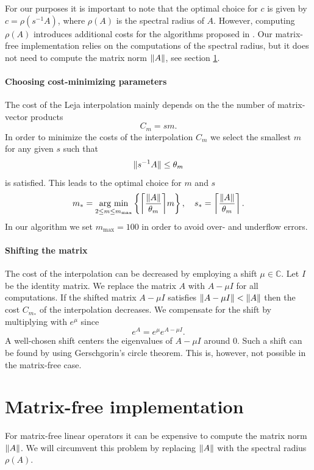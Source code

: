 \documentclass{scrartcl}
\begin{document}
For our purposes it is important to note that the optimal choice for $c$ is given by $c=\rho(s^{-1}A)$, where $\rho(A)$ is the spectral radius of $A$. However, computing $\rho(A)$ introduces additional costs for the algorithms proposed in \cite{lejarev}. Our matrix-free implementation relies on the computations of the spectral radius, but it does not need to compute the matrix norm $\lVert A\rVert$, see section \ref{matrixfreeimplementation}.

\paragraph{Choosing cost-minimizing parameters}
The cost of the Leja interpolation mainly depends on the the number of matrix-vector products
\[
C_{m} = sm. 
\]
In order to minimize the costs of the interpolation $C_m$ we select the smallest $m$ for any given $s$ such that
\[
\lVert s^{-1}A\rVert \le \theta_m
\]
is satisfied. This leads to the optimal choice for $m$ and $s$ 
\[
m_* = \underset{2\le m\le m_{\operatorname{max}}}{\operatorname{arg\ min}}  \left\{{\left\lceil{\frac{\norm{A}}{\theta_m}}\right\rceil}m\right\}, \quad
s_* =  \left\lceil{\frac{\norm{A}}{\theta_m}}\right\rceil.
\]
In our algorithm we set $m_{\operatorname{max}} = 100$ in order to avoid over- and underflow errors.

\paragraph{Shifting the matrix}
The cost of the interpolation can be decreased by employing a shift $\mu\in\mathbb{C}$. Let $I$ be the identity matrix. We replace the matrix $A$ with $A-\mu I$ for all computations. If the shifted matrix $A-\mu I$ satisfies $\lVert A -\mu I\rVert < \lVert A\rVert$ then the cost $C_{m_*}$ of the interpolation decreases.
We compensate for the shift by multiplying with $e^\mu$ since
\[
	e^{A} = e^{\mu}e^{A-\mu I}.
\]
A well-chosen shift centers the eigenvalues of $A-\mu I$ around $0$. Such a shift can be found by using Gerschgorin's circle theorem. This is, however, not possible in the matrix-free case.

\section{Matrix-free implementation}\label{matrixfreeimplementation}
For matrix-free linear operators it can be expensive to compute the matrix norm $\lVert A\rVert$. We will circumvent this problem by replacing $\lVert A\rVert$ with the spectral radius $\rho(A)$. 
\end{document}
